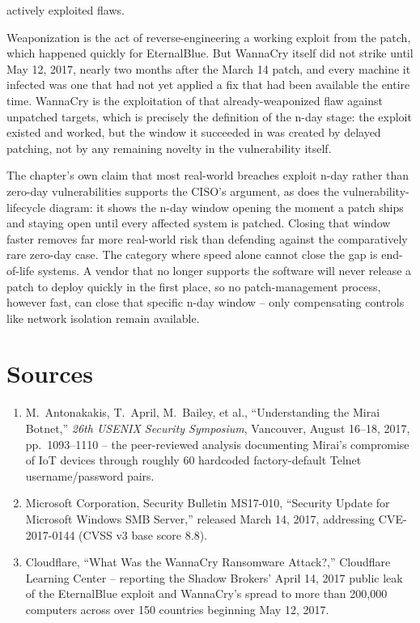 \begin{answerkey}
actively exploited flaws.
\item Weaponization is the act of reverse-engineering a working exploit from the patch, which
happened quickly for EternalBlue. But WannaCry itself did not strike until May 12, 2017, nearly two
months after the March 14 patch, and every machine it infected was one that had not yet applied a
fix that had been available the entire time. WannaCry is the exploitation of that already-weaponized
flaw against unpatched targets, which is precisely the definition of the n-day stage: the exploit
existed and worked, but the window it succeeded in was created by delayed patching, not by any
remaining novelty in the vulnerability itself.
\item The chapter's own claim that most real-world breaches exploit n-day rather than zero-day
vulnerabilities supports the CISO's argument, as does the vulnerability-lifecycle diagram: it shows
the n-day window opening the moment a patch ships and staying open until every affected system is
patched. Closing that window faster removes far more real-world risk than defending against the
comparatively rare zero-day case. The category where speed alone cannot close the gap is
end-of-life systems. A vendor that no longer supports the software will never release a patch to
deploy quickly in the first place, so no patch-management process, however fast, can close that
specific n-day window -- only compensating controls like network isolation remain available.
\end{answerkey}

\section*{Sources}
\begin{enumerate}[label=\lbrack\arabic*\rbrack, leftmargin=2.2em]
\item {}M.\ Antonakakis, T.\ April, M.\ Bailey, et al., ``Understanding the Mirai
Botnet,'' \emph{26th USENIX Security Symposium}, Vancouver, August 16--18, 2017, pp.\ 1093--1110 --
the peer-reviewed analysis documenting Mirai's compromise of IoT devices through roughly 60
hardcoded factory-default Telnet username/password pairs.
\item {}Microsoft Corporation, Security Bulletin MS17-010, ``Security Update for
Microsoft Windows SMB Server,'' released March 14, 2017, addressing CVE-2017-0144 (CVSS v3 base
score 8.8).
\item {}Cloudflare, ``What Was the WannaCry Ransomware Attack?,'' Cloudflare Learning
Center -- reporting the Shadow Brokers' April 14, 2017 public leak of the EternalBlue exploit and
WannaCry's spread to more than 200{,}000 computers across over 150 countries beginning May 12,
2017.
\end{enumerate}
